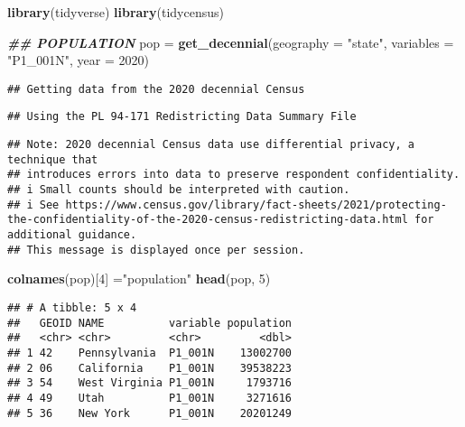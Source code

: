 \documentclass[
]{article}
\newenvironment{Shaded}{\begin{snugshade}}{\end{snugshade}}
\newcommand{\AttributeTok}[1]{\textcolor[rgb]{0.13,0.29,0.53}{#1}}
\newcommand{\DecValTok}[1]{\textcolor[rgb]{0.00,0.00,0.81}{#1}}
\newcommand{\DocumentationTok}[1]{\textcolor[rgb]{0.56,0.35,0.01}{\textbf{\textit{#1}}}}
\newcommand{\FunctionTok}[1]{\textcolor[rgb]{0.13,0.29,0.53}{\textbf{#1}}}
\newcommand{\NormalTok}[1]{#1}
\newcommand{\OtherTok}[1]{\textcolor[rgb]{0.56,0.35,0.01}{#1}}
\newcommand{\StringTok}[1]{\textcolor[rgb]{0.31,0.60,0.02}{#1}}
\begin{document}
\begin{Shaded}
\begin{Highlighting}[]
\FunctionTok{library}\NormalTok{(tidyverse)}
\FunctionTok{library}\NormalTok{(tidycensus)}

\DocumentationTok{\#\# POPULATION}
\NormalTok{pop }\OtherTok{=} \FunctionTok{get\_decennial}\NormalTok{(}\AttributeTok{geography =} \StringTok{"state"}\NormalTok{, }
                  \AttributeTok{variables =} \StringTok{"P1\_001N"}\NormalTok{, }
                  \AttributeTok{year =} \DecValTok{2020}\NormalTok{)}
\end{Highlighting}
\end{Shaded}

\begin{verbatim}
## Getting data from the 2020 decennial Census
\end{verbatim}

\begin{verbatim}
## Using the PL 94-171 Redistricting Data Summary File
\end{verbatim}

\begin{verbatim}
## Note: 2020 decennial Census data use differential privacy, a technique that
## introduces errors into data to preserve respondent confidentiality.
## i Small counts should be interpreted with caution.
## i See https://www.census.gov/library/fact-sheets/2021/protecting-the-confidentiality-of-the-2020-census-redistricting-data.html for additional guidance.
## This message is displayed once per session.
\end{verbatim}

\begin{Shaded}
\begin{Highlighting}[]
\FunctionTok{colnames}\NormalTok{(pop)[}\DecValTok{4}\NormalTok{] }\OtherTok{=}\StringTok{"population"}
\FunctionTok{head}\NormalTok{(pop, }\DecValTok{5}\NormalTok{)}
\end{Highlighting}
\end{Shaded}

\begin{verbatim}
## # A tibble: 5 x 4
##   GEOID NAME          variable population
##   <chr> <chr>         <chr>         <dbl>
## 1 42    Pennsylvania  P1_001N    13002700
## 2 06    California    P1_001N    39538223
## 3 54    West Virginia P1_001N     1793716
## 4 49    Utah          P1_001N     3271616
## 5 36    New York      P1_001N    20201249
\end{verbatim}
\end{document}
